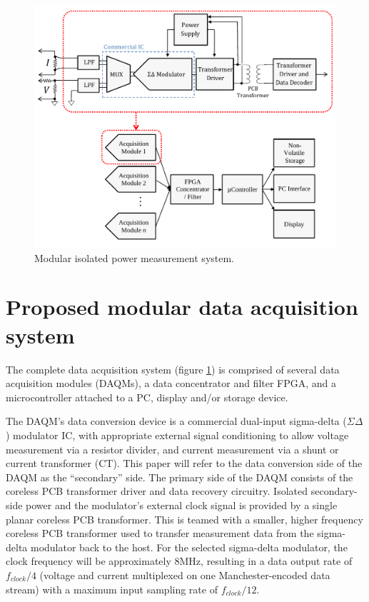 \documentclass[conference]{IEEEtran}
\begin{document}
\begin{figure}[t]
	\centering
	\includegraphics[width=0.9\columnwidth]{./img/FullSystem_BasicCol}
	\caption{Modular isolated power measurement system.}
	\label{fig:FullSystem}
\end{figure}

\section{Proposed modular data acquisition system}
The complete data acquisition system (figure \ref{fig:FullSystem}) is comprised of several data acquisition modules (DAQMs), a data concentrator and filter FPGA, and a microcontroller attached to a PC, display and/or storage device.

The DAQM's data conversion device is a commercial dual-input sigma-delta ($\Sigma\Delta$) modulator IC, with appropriate external signal conditioning to allow voltage measurement via a resistor divider, and current measurement via a shunt or current transformer (CT).  This paper will refer to the data conversion side of the DAQM as the ``secondary'' side.  The primary side of the DAQM consists of the coreless PCB transformer driver and data recovery circuitry.  Isolated secondary-side power and the modulator's external clock signal is provided by a single planar coreless PCB transformer.  This is teamed with a smaller,  higher frequency coreless PCB transformer used to transfer measurement data from the sigma-delta modulator back to the host.  For the selected sigma-delta modulator, the clock frequency will be approximately 8MHz, resulting in a data output rate of $ f_{clock}/4 $ (voltage and current multiplexed on one Manchester-encoded data stream) with a maximum input sampling rate of $ f_{clock}/12 $.
\end{document}
